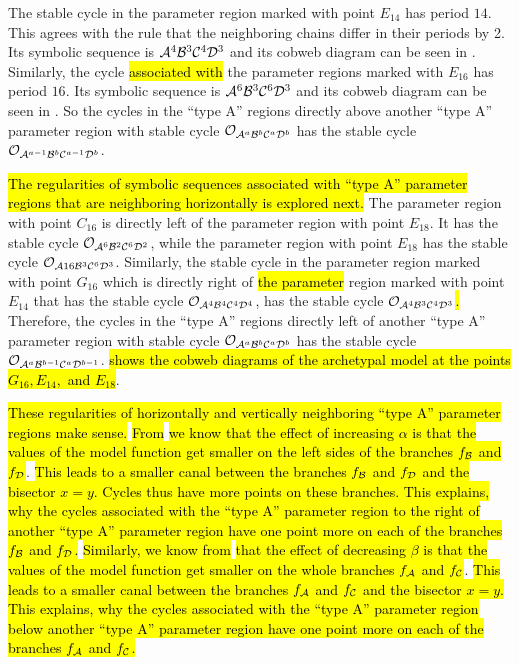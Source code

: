 The stable cycle in the parameter region marked with point $E_{14}$ has period $14$.
This agrees with the rule that the neighboring chains differ in their periods by 2.
Its symbolic sequence is $\mathcal{A}^4\mathcal{B}^3\mathcal{C}^4\mathcal{D}^3$ and its cobweb diagram can be seen in .
Similarly, the cycle \hl{associated with} the parameter regions marked with $E_{16}$ has period $16$.
Its symbolic sequence is $\mathcal{A}^6\mathcal{B}^3\mathcal{C}^6\mathcal{D}^3$ and its cobweb diagram can be seen in .
So the cycles in the ``type A'' regions directly above another ``type A'' parameter region with stable cycle $\mathcal{O}_{\mathcal{A}^a\mathcal{B}^b\mathcal{C}^a\mathcal{D}^b}$ has the stable cycle $\mathcal{O}_{\mathcal{A}^{a-1}\mathcal{B}^b\mathcal{C}^{a-1}\mathcal{D}^b}$.

\hl{
	The regularities of symbolic sequences associated with ``type A'' parameter regions that are neighboring horizontally is explored next.
}
The parameter region with point $C_{16}$ is directly left of the parameter region with point $E_{18}$.
It has the stable cycle $\mathcal{O}_{\mathcal{A}^6\mathcal{B}^2\mathcal{C}^6\mathcal{D}^2}$, while the parameter region with point $E_{18}$ has the stable cycle $\mathcal{O}_{\mathcal{A}16\mathcal{B}^3\mathcal{C}^6\mathcal{D}^3}$.
Similarly, the stable cycle in the parameter region marked with point $G_{16}$ which is directly right of \hl{the parameter} region marked with point $E_{14}$ that has the stable cycle $\mathcal{O}_{\mathcal{A}^4\mathcal{B}^4\mathcal{C}^4\mathcal{D}^4}$, has the stable cycle $\mathcal{O}_{\mathcal{A}^4\mathcal{B}^3\mathcal{C}^4\mathcal{D}^3}$\hl{.}
Therefore, the cycles in the ``type A'' regions directly left of another ``type A'' parameter region with stable cycle $\mathcal{O}_{\mathcal{A}^a\mathcal{B}^b\mathcal{C}^a\mathcal{D}^b}$ has the stable cycle $\mathcal{O}_{\mathcal{A}^a\mathcal{B}^{b-1}\mathcal{C}^a\mathcal{D}^{b-1}}$.
 \hl{shows the cobweb diagrams of the archetypal model at the points $G_{16}, E_{14},$ and $E_{18}$}.

\hl{
	These regularities of horizontally and vertically neighboring ``type A'' parameter regions make sense.
}
\hl{From}  \hl{we know that the effect of increasing $\alpha$ is that the values of the model function get smaller on the left sides of the branches $f_{\mathcal{B}}$ and $f_{\mathcal{D}}$}.
\hl{
	This leads to a smaller canal between the branches $f_{\mathcal{B}}$ and $f_{\mathcal{D}}$ and the bisector $x = y$.
	Cycles thus have more points on these branches.
	This explains, why the cycles associated with the ``type A'' parameter region to the right of another ``type A'' parameter region have one point more on each of the branches $f_{\mathcal{B}}$ and $f_{\mathcal{D}}$.
}
\hl{Similarly, we know from}  \hl{that the effect of decreasing $\beta$ is that the values of the model function get smaller on the whole branches $f_{\mathcal{A}}$ and $f_{\mathcal{C}}$}.
\hl{
	This leads to a smaller canal between the branches $f_{\mathcal{A}}$ and $f_{\mathcal{C}}$ and the bisector $x = y$.
	This explains, why the cycles associated with the ``type A'' parameter region below another ``type A'' parameter region have one point more on each of the branches $f_{\mathcal{A}}$ and $f_{\mathcal{C}}$.
}
